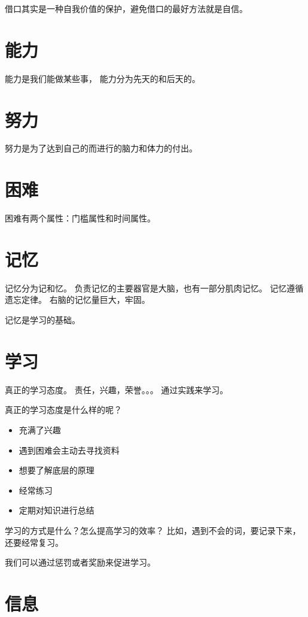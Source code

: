 借口其实是一种自我价值的保护，避免借口的最好方法就是自信。

\section{能力}

能力是我们能做某些事，
能力分为先天的和后天的。


\section{努力}


努力是为了达到自己的而进行的脑力和体力的付出。

\section{困难}

困难有两个属性：门槛属性和时间属性。

\section{记忆}

记忆分为记和忆。
负责记忆的主要器官是大脑，也有一部分肌肉记忆。
记忆遵循遗忘定律。
右脑的记忆量巨大，牢固。


记忆是学习的基础。


\section{学习}

真正的学习态度。
责任，兴趣，荣誉。。。
通过实践来学习。

真正的学习态度是什么样的呢？
\begin{itemize}
\item 充满了兴趣
\item 遇到困难会主动去寻找资料
\item 想要了解底层的原理
\item 经常练习
\item 定期对知识进行总结
\end{itemize}



学习的方式是什么？怎么提高学习的效率？
比如，遇到不会的词，要记录下来，还要经常复习。



我们可以通过惩罚或者奖励来促进学习。

\section{信息}

